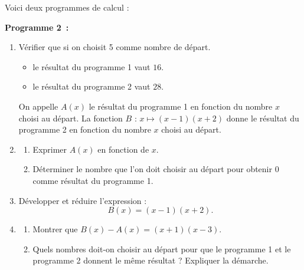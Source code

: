 \documentclass[exercice]{thedocument}%
\begin{document}
%
Voici deux programmes de calcul :\par\smallskip\noindent
\begin{minipage}[c]{.38\linewidth}
    \def\programlenght{1}
\end{minipage}\hfil
\begin{minipage}[c]{.5\linewidth}
    {\centering\bfseries Programme 2~:\par}\medskip\noindent
\end{minipage}
\medskip
\begin{enumerate}
\item Vérifier que si on choisit 5 comme nombre de départ.
\setlength\parindent{9mm}
\begin{itemize}
\item[$\bullet~~$]le résultat du programme 1 vaut $16$.
\item[$\bullet~~$]le résultat du programme 2 vaut $28$. 
\end{itemize}
\setlength\parindent{0mm}
On appelle $A(x)$ le résultat du programme 1 en fonction du nombre $x$ choisi au départ.
La fonction $B$  :  $x \longmapsto  (x - 1)(x + 2)$ donne le résultat du programme 2 en fonction du nombre $x$ choisi au départ.
\item
	\begin{enumerate}
		\item Exprimer $A(x)$ en fonction de $x$.
		\item Déterminer le nombre que l'on doit choisir au départ pour obtenir 0 comme résultat du
programme 1.
	\end{enumerate}
\item  Développer et réduire l'expression :
\[B(x) = (x - 1)(x + 2).\]
\item
	\begin{enumerate}
		\item Montrer que $B(x) - A(x) = (x + 1)(x - 3)$.
		\item  Quels nombres doit-on choisir au départ pour que le programme 1 et le programme 2 donnent le même résultat ? Expliquer la démarche.
	\end{enumerate}
\end{enumerate}
\showthesource
\end{document}
